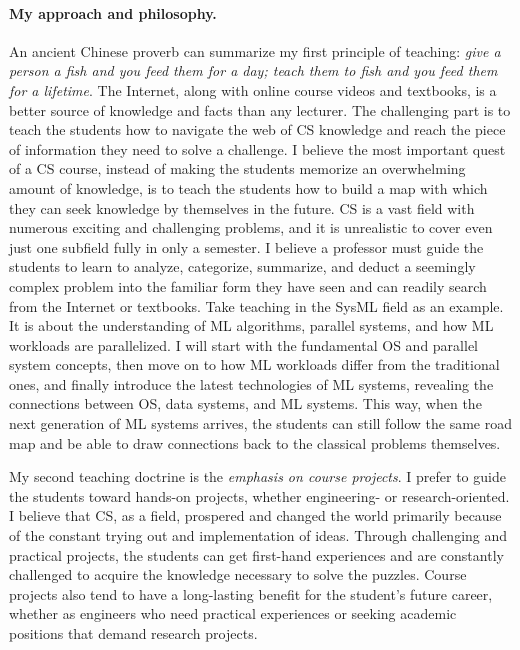 \documentclass[letterpaper]{article}
\begin{document}
\paragraph{My approach and philosophy.} An ancient Chinese proverb can summarize my first principle of teaching: \textit{give a person a fish and you feed them for a day; teach them to fish and you feed them for a lifetime}. The Internet, along with online course videos and textbooks, is a better source of knowledge and facts than any lecturer. The challenging part is to teach the students how to navigate the web of CS knowledge and reach the piece of information they need to solve a challenge. I believe the most important quest of a CS course, instead of making the students memorize an overwhelming amount of knowledge, is to teach the students how to build a map with which they can seek knowledge by themselves in the future. CS is a vast field with numerous exciting and challenging problems, and it is unrealistic to cover even just one subfield fully in only a semester. I believe a professor must guide the students to learn to analyze, categorize, summarize, and deduct a seemingly complex problem into the familiar form they have seen and can readily search from the Internet or textbooks. Take teaching in the SysML field as an example. It is about the understanding of ML algorithms, parallel systems, and how ML workloads are parallelized. I will start with the fundamental OS and parallel system concepts, then move on to how ML workloads differ from the traditional ones, and finally introduce the latest technologies of ML systems, revealing the connections between OS, data systems, and ML systems. This way, when the next generation of ML systems arrives, the students can still follow the same road map and be able to draw connections back to the classical problems themselves. 

My second teaching doctrine is the \textit{emphasis on course projects}. I prefer to guide the students toward hands-on projects, whether engineering- or research-oriented. I believe that CS, as a field, prospered and changed the world primarily because of the constant trying out and implementation of ideas. Through challenging and practical projects, the students can get first-hand experiences and are constantly challenged to acquire the knowledge necessary to solve the puzzles. Course projects also tend to have a long-lasting benefit for the student's future career, whether as engineers who need practical experiences or seeking academic positions that demand research projects.
\end{document}
